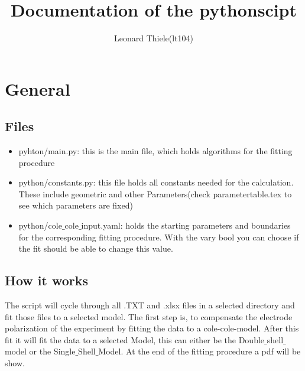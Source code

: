 \documentclass[10pt,a4paper]{article}
\title{Documentation of the pythonscipt}
\author{Leonard Thiele(lt104)}
\renewcommand{\*}{\cdot}
\begin{document}
\section{General}{
\subsection{Files}{
\begin{itemize}
\item pyhton/main.py: this is the main file, which holds algorithms for the fitting procedure
\item python/constants.py: this file holds all constants needed for the calculation. These include geometric and other Parameters(check parametertable.tex to see which parameters are fixed)
\item python/cole$\_$cole$\_$input.yaml: holds the starting parameters and boundaries for the corresponding fitting procedure. With the vary bool you can choose if the fit should be able to change this value. 
\end{itemize}
}
\subsection{How it works}{
The script will cycle through all .TXT and .xlsx files in a selected directory and fit those files to a selected model. The first step is, to compensate the electrode polarization of the experiment by fitting the data to a cole-cole-model. After this fit it will fit the data to a selected Model, this can either be the Double$\_$shell$\_$model or the Single$\_$Shell$\_$Model. At the end of the fitting procedure a pdf will be show.   
}%
}
\end{document}
